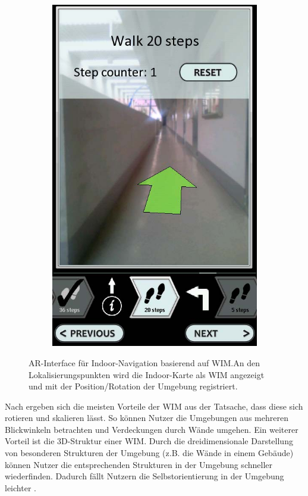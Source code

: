 \begin{figure}
\begin{subfigure}{.18\textwidth}
        \includegraphics[width=\textwidth]{figures/mulloni2011_wim_e.png}
        \caption{}
        \label{sfig:mulloni2011_wim_e}
    \end{subfigure}
    \caption{AR-Interface für Indoor-Navigation basierend auf WIM.\@ An den Lokalisierungspunkten wird die Indoor-Karte als WIM angezeigt und mit der Position/Rotation der Umgebung registriert. }
    \label{fig:mulloni2011_wim}
\end{figure}

Nach \textcite[272]{Stoakley1995} ergeben sich die meisten Vorteile der WIM aus der Tatsache, dass diese sich rotieren und skalieren lässt.
So können Nutzer die Umgebungen aus mehreren Blickwinkeln betrachten und Verdeckungen durch Wände umgehen.
Ein weiterer Vorteil ist die 3D-Struktur einer WIM.
Durch die dreidimensionale Darstellung von besonderen Strukturen der Umgebung (z.B. die Wände in einem Gebäude) können Nutzer die entsprechenden Strukturen in der Umgebung schneller wiederfinden.
Dadurch fällt Nutzern die Selbstorientierung in der Umgebung leichter \parencite[215]{Mulloni2012}.

